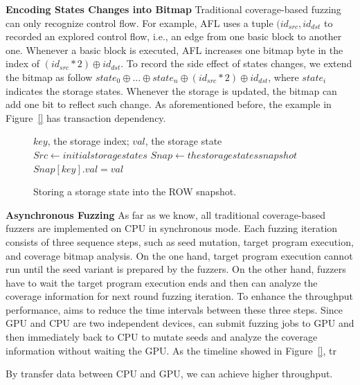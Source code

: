 \noindent \textbf{Encoding States Changes into Bitmap}
Traditional coverage-based fuzzing can only recognize control flow. For example, AFL uses a tuple $(id_{src}, id_{dst}$ to recorded an explored control flow, i.e., an edge from one basic block to another one. Whenever a basic block is executed, AFL increases one bitmap byte in the index of $(id_{src} * 2) \oplus id_{dst}$. 
To record the side effect of states changes, we extend the bitmap as follow $state_0 \oplus ... \oplus state_n \oplus (id_{src} * 2) \oplus id_{dst}$, where $state_i$ indicates the storage states. 
Whenever the storage is updated, the bitmap can add one bit to reflect such change. 
As aforementioned before, the example in Figure~\ref{} has transaction dependency.  



\begin{figure}[t]
\begin{algorithm}[H]
\caption{Storing a storage state into the ROW snapshot.}
\label{algo:row_sstore}
\begin{algorithmic}[1]
    \Require $key$, the storage index; $val$, the storage state
    \State $Src \gets initial storage states$
    \State $Snap \gets the storage states snapshot$
        \State $Snap[key].val = val$
        \State \Return
    \EndIf
\end{algorithmic}
\end{algorithm}
\end{figure}


\noindent \textbf{Asynchronous Fuzzing}
As far as we know, all traditional coverage-based fuzzers are implemented on CPU in synchronous mode. Each fuzzing iteration consists of three sequence steps, such as seed mutation, target program execution, and coverage bitmap analysis. 
On the one hand, target program execution cannot run until the seed variant is prepared by the fuzzers. 
On the other hand, fuzzers have to wait the target program execution ends and then can analyze the coverage information for next round fuzzing iteration. 
To enhance the throughput performance, {\tool} aims to reduce the time intervals between these three steps.
Since GPU and CPU are two independent devices, {\runner} can submit fuzzing jobs to GPU and then immediately back to CPU to mutate seeds and analyze the coverage information without waiting the GPU. 
As the timeline showed in Figure~\ref{}, tr

By transfer data between CPU and GPU, we can achieve higher throughput. 
%

